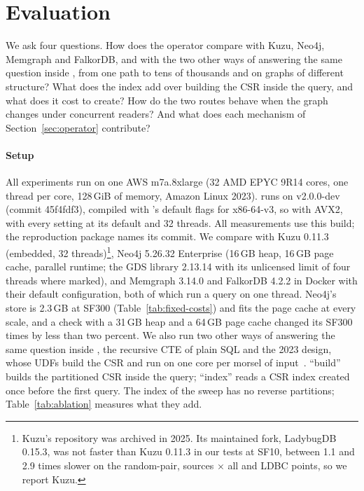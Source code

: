 \section{Evaluation}
\label{sec:eval}

We ask four questions. How does the operator compare with Kuzu, Neo4j, Memgraph and FalkorDB, and with the two
other ways of answering the same question inside \duckdb, from one path to tens of thousands and on graphs of
different structure? What does the index add over building the CSR inside the query, and what does it cost to
create? How do the two routes behave when the graph changes under concurrent readers? And what does each mechanism
of Section~\ref{sec:operator} contribute?

\paragraph{Setup} All experiments run on one AWS m7a.8xlarge (32 AMD EPYC 9R14 cores, one thread per core, 128\,GiB
of memory, Amazon Linux 2023). \duckpgq runs on \duckdb v2.0.0-dev (commit 45f4fdf3), compiled with \duckdb's default
flags for x86-64-v3, so with AVX2, with every setting at its default and 32 threads. All measurements use this build; the
reproduction package names its commit. We compare with Kuzu 0.11.3 (embedded, 32 threads)\footnote{Kuzu's repository was archived in 2025. Its maintained fork, LadybugDB 0.15.3,
was not faster than Kuzu 0.11.3 in our tests at SF10, between 1.1 and 2.9 times slower on the random-pair,
sources $\times$ all and LDBC points, so we report Kuzu.}, Neo4j 5.26.32 Enterprise (16\,GB heap, 16\,GB page cache, parallel runtime; the
GDS library 2.13.14 with its unlicensed limit of four threads where marked), and Memgraph 3.14.0 and FalkorDB 4.2.2 in Docker with their default configuration, both of which run a query on one thread. Neo4j's store is 2.3\,GB at SF300 (Table~\ref{tab:fixed-costs}) and fits the page cache at every scale, and a check with a 31\,GB heap and a 64\,GB page cache changed its SF300 times by less than two percent. We also run two other ways of answering the same question inside \duckdb, the recursive CTE of plain SQL and the
2023 \duckpgq design, whose UDFs build the CSR and run \msbfs on one core per morsel of
input~\cite{tenwolde2023duckpgq}. ``\duckpgq build''
builds the partitioned CSR inside the query; ``\duckpgq index'' reads a CSR index created once before the first
query. The index of the sweep has no reverse partitions; Table~\ref{tab:ablation} measures what they add.

